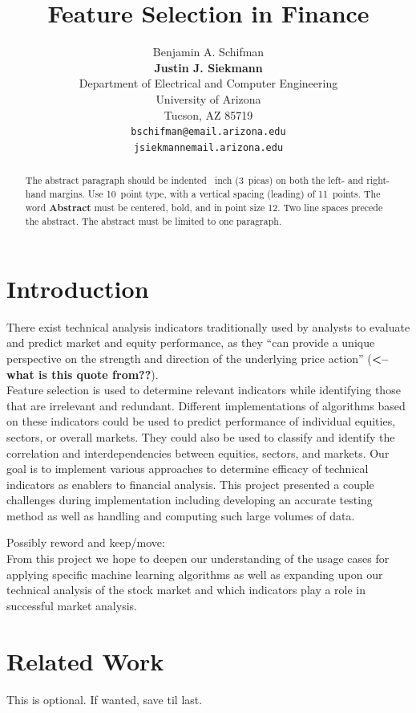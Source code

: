 \documentclass{article}
\title{Feature Selection in Finance}
\author{
  Benjamin A. Schifman\\
  \textbf{Justin J. Siekmann}\\
  Department of Electrical and Computer Engineering\\
  University of Arizona\\
  Tucson, AZ 85719 \\
  \texttt{bschifman@email.arizona.edu} \\
  \texttt{jsiekmannemail.arizona.edu}
}
\begin{document}
 

\maketitle

\begin{abstract}
  The abstract paragraph should be indented ~inch
  (3~picas) on both the left- and right-hand margins. Use 10~point
  type, with a vertical spacing (leading) of 11~points.  The word
  \textbf{Abstract} must be centered, bold, and in point size 12. Two
  line spaces precede the abstract. The abstract must be limited to
  one paragraph.
\end{abstract}

\section{Introduction}
There exist technical analysis indicators traditionally used by analysts to evaluate and predict market and equity performance, as they “can provide a unique perspective on the strength and direction of the underlying price action” ({\bf <--what is this quote from??}). \\
Feature selection is used to determine relevant indicators while identifying those that are irrelevant and redundant. Different implementations of algorithms based on these indicators could be used to predict performance of individual equities, sectors, or overall markets. They could also be used to classify and identify the correlation and interdependencies between equities, sectors, and markets. Our goal is to implement various approaches to determine efficacy of technical indicators as enablers to financial analysis. This project presented a couple challenges during implementation including developing an accurate testing method as well as handling and computing such large volumes of data.

Possibly reword and keep/move:\\
From this project we hope to deepen our understanding of the usage cases for applying specific machine learning algorithms as well as expanding upon our technical analysis of the stock market and which indicators play a role in successful market analysis.

\section{Related Work}
This is optional. If wanted, save til last.
\end{document}
